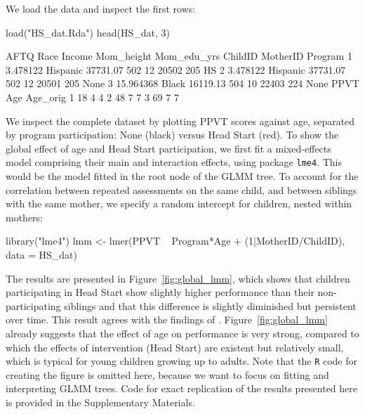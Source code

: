 \documentclass[doc,floatsintext,natbib]{apa7}
\begin{document}
We load the data and inspect the first rows:

\begin{Schunk}
\begin{Sinput}
 load("HS_dat.Rda")
 head(HS_dat, 3)
\end{Sinput}
\begin{Soutput}
       AFTQ     Race   Income Mom_height Mom_edu_yrs ChildID MotherID Program
1  3.478122 Hispanic 37731.07        502          12   20502      205      HS
2  3.478122 Hispanic 37731.07        502          12   20501      205    None
3 15.964368    Black 16119.13        504          10   22403      224    None
  PPVT Age Age_orig
1   18   4        4
2   48   7        7
3   69   7        7
\end{Soutput}
\end{Schunk}

We inspect the complete dataset by plotting PPVT scores against age, separated by program participation: None (black) versus Head Start (red). To show the global effect of age and Head Start participation, we first fit a mixed-effects model comprising their main and interaction effects, using package \texttt{lme4}. This would be the model fitted in the root node of the GLMM tree. To account for the correlation between repeated assessments on the same child, and between siblings with the same mother, we specify a random intercept for children, nested within mothers:

\begin{Schunk}
\begin{Sinput}
 library("lme4")
 lmm <- lmer(PPVT ~ Program*Age + (1|MotherID/ChildID), data = HS_dat)
\end{Sinput}
\end{Schunk}

The results are presented in Figure~\ref{fig:global_lmm}, which shows that children participating in Head Start show slightly higher performance than their non-participating siblings and that this difference is slightly diminished but persistent over time. This result agrees with the findings of \cite{Demi09}. Figure~\ref{fig:global_lmm} already suggests that the effect of age on performance is very strong, compared to which the effects of intervention (Head Start) are existent but relatively small, which is typical for young children growing up to adults. Note that the \texttt{R} code for creating the figure is omitted here, because we want to focus on fitting and interpreting GLMM trees. Code for exact replication of the results presented here is provided in the Supplementary Materials. 
\end{document}
